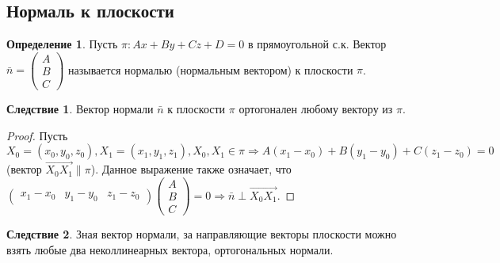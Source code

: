 \documentclass[a4paper, 12pt]{article}
\theoremstyle{definition}
\newtheorem*{definition}{Определение}
\newtheorem*{consequense}{Следствие}
\begin{document}
	\subsection{Нормаль к плоскости}
	\begin{definition}
		Пусть $\pi: Ax + By + Cz + D = 0$ в прямоугольной с.к. Вектор $\bar{n} = \begin{pmatrix} A  \\ B \\ C \end{pmatrix}$ называется нормалью (нормальным вектором) к плоскости $\pi$.
	\end{definition}
	\begin{consequense}
		Вектор нормали $\bar{n}$ к плоскости $\pi$ ортогонален любому вектору из $\pi$.
	\end{consequense}
	\begin{proof}
		Пусть $X_0 = (x_0, y_0, z_0), X_1 = (x_1, y_1, z_1), X_0, X_1 \in \pi \Rightarrow A(x_1-x_0) + B(y_1-y_0) + C(z_1 - z_0) = 0$ (вектор $\overrightarrow{X_0X_1} \parallel \pi$). Данное выражение также означает, что $\begin{pmatrix} x_1-x_0&y_1-y_0&z_1-z_0\end{pmatrix}\begin{pmatrix} A  \\ B \\ C \end{pmatrix} = 0 \Rightarrow \bar{n}\perp\overrightarrow{X_0X_1}$.
	\end{proof}
	\begin{consequense}
		Зная вектор нормали, за направляющие векторы плоскости можно взять любые два неколлинеарных вектора, ортогональных нормали.
	\end{consequense}
\end{document}
